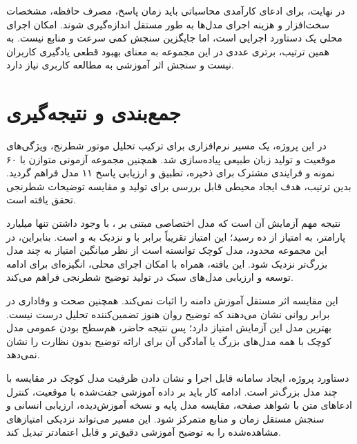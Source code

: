در نهایت، برای ادعای کارآمدی محاسباتی باید زمان پاسخ، مصرف حافظه، مشخصات سخت‌افزار و هزینه اجرای مدل‌ها به طور مستقل اندازه‌گیری شوند. امکان اجرای محلی یک دستاورد اجرایی است، اما جایگزین سنجش کمی سرعت و منابع نیست. به همین ترتیب، برتری عددی در این مجموعه به معنای بهبود قطعی یادگیری کاربران نیست و سنجش اثر آموزشی به مطالعه کاربری نیاز دارد.

\section{جمع‌بندی و نتیجه‌گیری}
در این پروژه، یک مسیر نرم‌افزاری برای ترکیب تحلیل موتور شطرنج، ویژگی‌های موقعیت و تولید زبان طبیعی پیاده‌سازی شد. همچنین مجموعه آزمونی متوازن با ۶۰ نمونه و فرایندی مشترک برای ذخیره، تطبیق و ارزیابی پاسخ ۱۱ مدل فراهم گردید. بدین ترتیب، هدف ایجاد محیطی قابل بررسی برای تولید و مقایسه توضیحات شطرنجی تحقق یافته است.

نتیجه مهم آزمایش آن است که مدل اختصاصی مبتنی بر ، با وجود داشتن تنها  میلیارد پارامتر، به امتیاز  از ده رسید؛ این امتیاز تقریباً برابر با  و نزدیک به  و  است. بنابراین، در این مجموعه محدود، مدل کوچک توانسته است از نظر میانگین امتیاز به چند مدل بزرگ‌تر نزدیک شود. این یافته، همراه با امکان اجرای محلی، انگیزه‌ای برای ادامه توسعه و ارزیابی مدل‌های سبک در تولید توضیح شطرنجی فراهم می‌کند.

این مقایسه اثر مستقل آموزش دامنه را اثبات نمی‌کند. همچنین صحت  و وفاداری  در برابر روانی  نشان می‌دهند که توضیح روان هنوز تضمین‌کننده تحلیل درست نیست. بهترین مدل این آزمایش امتیاز  دارد؛ پس نتیجه حاضر، هم‌سطح بودن عمومی مدل کوچک با همه مدل‌های بزرگ یا آمادگی آن برای ارائه توضیح بدون نظارت را نشان نمی‌دهد.

دستاورد پروژه، ایجاد سامانه قابل اجرا و نشان دادن ظرفیت مدل کوچک در مقایسه با چند مدل بزرگ‌تر است. ادامه کار باید بر داده آموزشی جفت‌شده با موقعیت، کنترل ادعاهای متن با شواهد صفحه، مقایسه مدل پایه و نسخه آموزش‌دیده، ارزیابی انسانی و سنجش مستقل زمان و منابع متمرکز شود. این مسیر می‌تواند نزدیکی امتیازهای مشاهده‌شده را به توضیح آموزشی دقیق‌تر و قابل اعتمادتر تبدیل کند.
